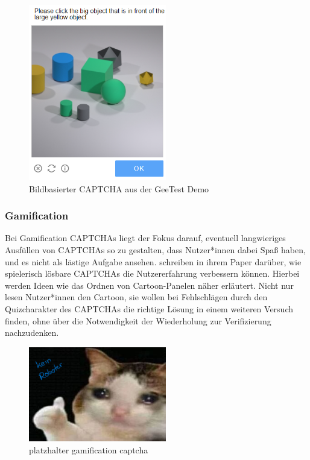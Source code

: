 \begin{figure}[h!]
        \centering
        \includegraphics[width=6cm]{gfx/mygraphics/raeumlich.png} 
    \caption{Bildbasierter CAPTCHA aus der GeeTest Demo}
    \label{fig:geetest}
\end{figure}

\subsubsection*{Gamification}
Bei Gamification CAPTCHAs liegt der Fokus darauf, eventuell langwieriges Ausfüllen von CAPTCHAs so zu gestalten, dass Nutzer*innen dabei Spaß haben,
und es nicht als lästige Aufgabe ansehen.
\citeauthor{gamified} schreiben in ihrem Paper  darüber, wie spielerisch lösbare CAPTCHAs die Nutzererfahrung verbessern können.
Hierbei werden Ideen wie das Ordnen von Cartoon-Panelen näher erläutert.
Nicht nur lesen Nutzer*innen den Cartoon, sie wollen bei Fehlschlägen durch den Quizcharakter des CAPTCHAs die richtige Lösung in einem weiteren Versuch finden,
ohne über die Notwendigkeit der Wiederholung zur Verifizierung nachzudenken. \cite[p.41ff]{gamified}

\begin{figure}[h!]
    \centering\includegraphics[width=6cm]{gfx/mygraphics/platzhalter.png}
     \caption{platzhalter gamification captcha}
      \label{fig:gamification}
\end{figure}


